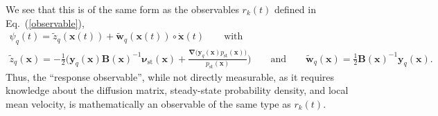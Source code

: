 \documentclass[aps,pre,twocolumn,superscriptaddress,notitlepage]{revtex4-2}
\newcommand{\n}{\nonumber}
\newcommand{\grad}{\bm{\nabla}}
\renewcommand{\eqref}[1]{Eq.~(\ref{#1})}
\begin{document}
We see that this is of the same form as the observables $r_k(t)$ defined in \eqref{observable},
\begin{gather}
\psi_q(t) = \tilde{z}_q(\bm{x}(t)) + \tilde{\bm{w}}_q(\bm{x}(t)) \circ \dot{\bm{x}}(t) \qquad \text{with} \label{response-observable-2} \\
\tilde{z}_q(\bm{x}) = - \frac{1}{2} \bigg( \bm{y}_q(\bm{x}) \bm{B}(\bm{x})^{-1} \bm{\nu}_\text{st}(\bm{x}) + \frac{\grad \big(\bm{y}_q(\bm{x}) p_\text{st}(\bm{x}) \big)}{p_\text{st}(\bm{x})} \bigg) \qquad \text{and} \qquad \tilde{\bm{w}}_q(\bm{x}) = \frac{1}{2} \bm{B}(\bm{x})^{-1} \bm{y}_q(\bm{x}) . \n
\end{gather}
Thus, the \enquote{response observable}, while not directly measurable, as it requires knowledge about the diffusion matrix, steady-state probability density, and local mean velocity, is mathematically an observable of the same type as $r_k(t)$.
\end{document}
